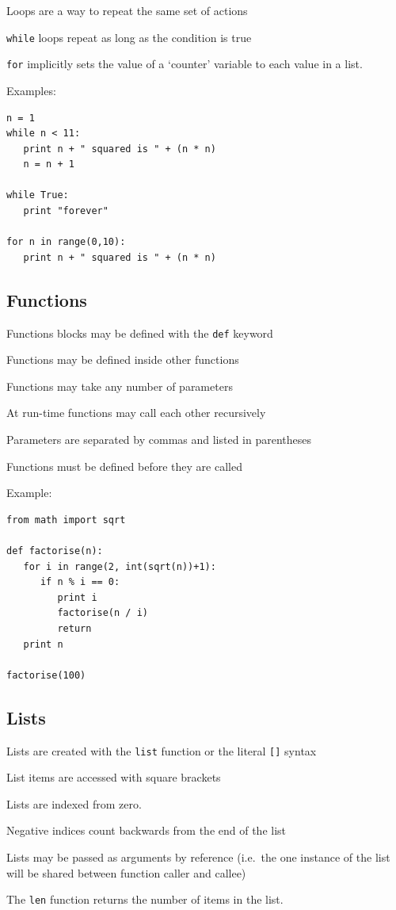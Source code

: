 \documentclass[12pt,a4paper,twoside]{article}
\renewcommand{\_}{\texttt{\symbol{95}}}
\begin{document}
\begin{bulletlist}
\item Loops are a way to repeat the same set of actions
\item \verb^while^ loops repeat as long as the condition is true
\item \verb^for^ implicitly sets the value of a `counter' variable to each value in a list.
\end{bulletlist}

Examples:
\begin{verbatim}
n = 1
while n < 11:
   print n + " squared is " + (n * n)
   n = n + 1

while True:
   print "forever"

for n in range(0,10):
   print n + " squared is " + (n * n)
\end{verbatim}

\subsection{Functions}

\begin{bulletlist}
\item Functions blocks may be defined with the \verb^def^ keyword
\item Functions may be defined inside other functions
\item Functions may take any number of parameters
\item At run-time functions may call each other recursively
\item Parameters are separated by commas and listed in parentheses
\item Functions must be defined before they are called
\end{bulletlist}

Example:
\begin{verbatim}
from math import sqrt

def factorise(n):
   for i in range(2, int(sqrt(n))+1):
      if n % i == 0:
         print i
         factorise(n / i)
         return
   print n
        
factorise(100)
\end{verbatim}

\subsection{Lists}

\begin{bulletlist}
\item Lists are created with the \verb^list^ function or the literal \verb^[]^ syntax
\item List items are accessed with square brackets
\item Lists are indexed from zero.
\item Negative indices count backwards from the end of the list
\item Lists may be passed as arguments by reference (i.e.\ the one
  instance of the list will be shared between function caller and callee)
\item The \verb^len^ function returns the number of items in the list.
\end{bulletlist}
\end{document}
